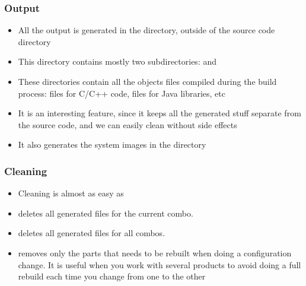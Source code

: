 \begin{frame}
  \frametitle{Output}
  \begin{itemize}
  \item All the output is generated in the
     directory, outside of the source code directory 
  \item This directory contains mostly two subdirectories:
     and 
  \item These directories contain all the objects files compiled
    during the build process:  files for C/C++ code,
     files for Java libraries, etc
  \item It is an interesting feature, since it keeps all the generated
    stuff separate from the source code, and we can easily clean without
    side effects
  \item It also generates the system images in the
     directory
  \end{itemize}
\end{frame}

\begin{frame}
  \frametitle{Cleaning}
  \begin{itemize}
  \item Cleaning is almost as easy as 
  \item {} deletes all generated files for the current combo.
  \item {} deletes all generated files for all combos.
  \item {} removes only the parts that needs to
    be rebuilt when doing a configuration change. It is useful when
    you work with several products to avoid doing a full rebuild each
    time you change from one to the other
  \end{itemize}
\end{frame}
